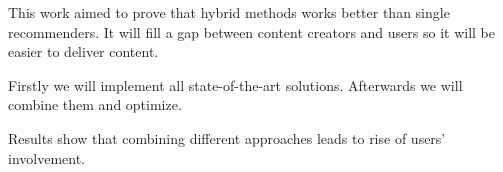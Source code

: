 \documentclass{article}
\begin{document}
        This work aimed to prove that hybrid methods works better than single recommenders. It will fill a gap between content creators and users so it will be easier to deliver content.

        Firstly we will implement all state-of-the-art solutions. Afterwards we will combine them and optimize.



        Results show that combining different approaches leads to rise of users' involvement.


    
      
\end{document}
